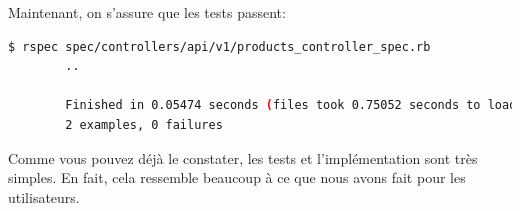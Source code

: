 \documentclass[]{report}
\begin{document}
      Maintenant, on s'assure que les tests passent:

      \begin{scriptsize}
        \begin{lstlisting}[language=bash]
        $ rspec spec/controllers/api/v1/products_controller_spec.rb
        ..

        Finished in 0.05474 seconds (files took 0.75052 seconds to load)
        2 examples, 0 failures
        \end{lstlisting}
      \end{scriptsize}

      Comme vous pouvez déjà le constater, les tests et l'implémentation sont très simples. En fait, cela ressemble beaucoup à ce que nous avons fait pour les utilisateurs.
\end{document}
